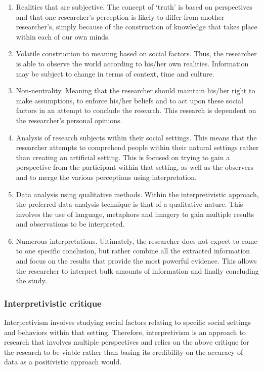\begin{enumerate}[label=\roman*.]
\item Realities that are subjective. The concept of ‘truth’ is based on perspectives and that one researcher's perception is likely to differ from another researcher’s, simply because of the construction of knowledge that takes place within each of our own minds.
\item Volatile construction to meaning based on social factors. Thus, the researcher is able to observe the world according to his/her own realities. Information may be subject to change in terms of context, time and culture.
\item Non-neutrality. Meaning that the researcher should maintain his/her right to make assumptions, to enforce his/her beliefs and to act upon these social factors in an attempt to conclude the research. This research is dependent on the researcher’s personal opinions.
\item Analysis of research subjects within their social settings. This means that the researcher attempts to comprehend people within their natural settings rather than creating an artificial setting. This is focused on trying to gain a perspective from the participant within that setting, as well as the observers and to merge the various perceptions using interpretation.
\item Data analysis using qualitative methods. Within the interpretivistic approach, the preferred data analysis technique is that of a qualitative nature. This involves the use of language, metaphors and imagery to gain multiple results and observations to be interpreted.
\item Numerous interpretations. Ultimately, the researcher does not expect to come to one specific conclusion, but rather combine all the extracted information and focus on the results that provide the most powerful evidence. This allows the researcher to interpret bulk amounts of information and finally concluding the study.
\end{enumerate}

\subsubsection{Interpretivistic critique}
Interpretivism involves studying social factors relating to specific social settings and behaviors within that setting. Therefore, interpretivism is an approach to research that involves multiple perspectives and relies on the above critique for the research to be viable rather than basing its credibility on the accuracy of data as a positivistic approach would.
